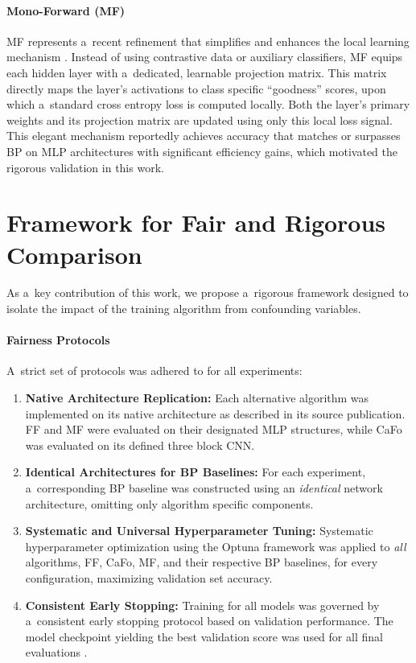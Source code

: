 \documentclass[letterpaper]{article}
\begin{document}
\paragraph{Mono-Forward (MF)}
MF represents a~recent refinement that simplifies and enhances the local learning mechanism \cite{gong2025mono}. Instead of using contrastive data or auxiliary classifiers, MF equips each hidden layer with a~dedicated, learnable projection matrix. This matrix directly maps the layer's activations to class specific ``goodness'' scores, upon which a~standard cross entropy loss is computed locally. Both the layer's primary weights and its projection matrix are updated using only this local loss signal. This elegant mechanism reportedly achieves accuracy that matches or surpasses BP on MLP architectures with significant efficiency gains, which motivated the rigorous validation in this work.

\section{Framework for Fair and Rigorous Comparison}

As a~key contribution of this work, we propose a~rigorous framework designed to isolate the impact of the training algorithm from confounding variables.

\paragraph{Fairness Protocols}
A~strict set of protocols was adhered to for all experiments:
\begin{enumerate}
    \item \textbf{Native Architecture Replication:} Each alternative algorithm was implemented on its native architecture as described in its source publication. FF and MF were evaluated on their designated MLP structures, while CaFo was evaluated on its defined three block CNN.
    \item \textbf{Identical Architectures for BP Baselines:} For each experiment, a~corresponding BP baseline was constructed using an \emph{identical} network architecture, omitting only algorithm specific components.
    \item \textbf{Systematic and Universal Hyperparameter Tuning:} Systematic hyperparameter optimization using the Optuna framework \cite{akiba2019optuna} was applied to \emph{all} algorithms, FF, CaFo, MF, and their respective BP baselines, for every configuration, maximizing validation set accuracy.
    \item \textbf{Consistent Early Stopping:} Training for all models was governed by a~consistent early stopping protocol based on validation performance. The model checkpoint yielding the best validation score was used for all final evaluations \cite{prechelt1998early}.
\end{enumerate}
\end{document}
